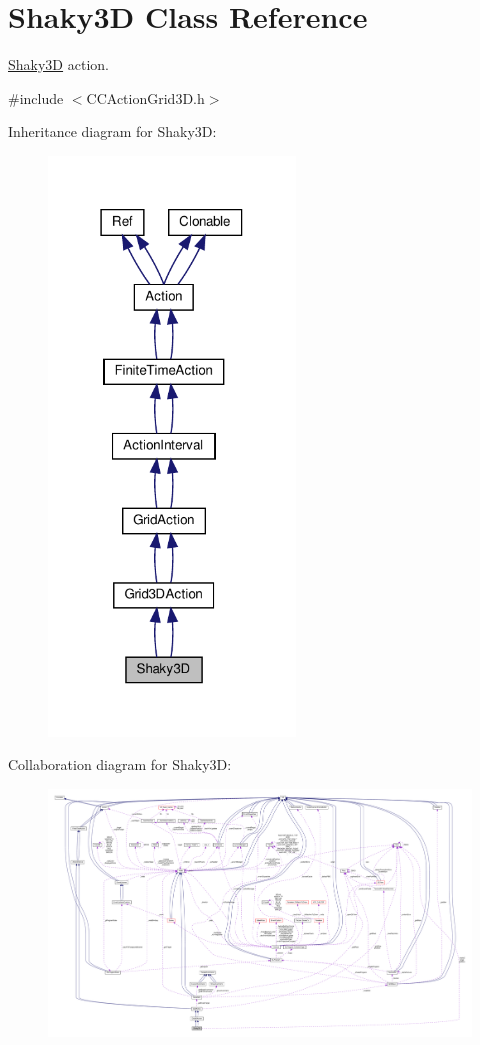 \hypertarget{classShaky3D}{}\section{Shaky3D Class Reference}
\label{classShaky3D}


\hyperlink{classShaky3D}{Shaky3D} action.  




{\ttfamily \#include $<$C\+C\+Action\+Grid3\+D.\+h$>$}



Inheritance diagram for Shaky3D\+:
\nopagebreak
\begin{figure}[H]
\begin{center}
\leavevmode
\includegraphics[width=186pt]{classShaky3D__inherit__graph}
\end{center}
\end{figure}


Collaboration diagram for Shaky3D\+:
\nopagebreak
\begin{figure}[H]
\begin{center}
\leavevmode
\includegraphics[width=350pt]{classShaky3D__coll__graph}
\end{center}
\end{figure}
